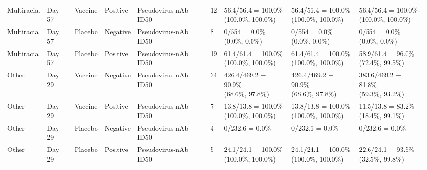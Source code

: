 \documentclass[]{book}
\theoremstyle{definition}
\theoremstyle{definition}
\theoremstyle{definition}
\newcommand{\1}{\mathbbm{1}}
\begin{document}
\begin{landscape}
\begin{ThreePartTable}
\begin{longtable}[t]{>{\raggedright\arraybackslash}p{2.7cm}llllllll}
\hspace{1em}Multiracial & Day 57 & Vaccine & Positive & Pseudovirus-nAb ID50 & 12 & \makecell[l]{56.4/56.4 = 100.0\%\\(100.0\%, 100.0\%)} & \makecell[l]{56.4/56.4 = 100.0\%\\(100.0\%, 100.0\%)} & \makecell[l]{56.4/56.4 = 100.0\%\\(100.0\%, 100.0\%)}\\
\hspace{1em}Multiracial & Day 57 & Placebo & Negative & Pseudovirus-nAb ID50 & 8 & \makecell[l]{0/554 = 0.0\%\\(0.0\%, 0.0\%)} & \makecell[l]{0/554 = 0.0\%\\(0.0\%, 0.0\%)} & \makecell[l]{0/554 = 0.0\%\\(0.0\%, 0.0\%)}\\
\hspace{1em}Multiracial & Day 57 & Placebo & Positive & Pseudovirus-nAb ID50 & 19 & \makecell[l]{61.4/61.4 = 100.0\%\\(100.0\%, 100.0\%)} & \makecell[l]{61.4/61.4 = 100.0\%\\(100.0\%, 100.0\%)} & \makecell[l]{58.9/61.4 = 96.0\%\\(72.4\%, 99.5\%)}\\
\hspace{1em}Other & Day 29 & Vaccine & Negative & Pseudovirus-nAb ID50 & 34 & \makecell[l]{426.4/469.2 = 90.9\%\\(68.6\%, 97.8\%)} & \makecell[l]{426.4/469.2 = 90.9\%\\(68.6\%, 97.8\%)} & \makecell[l]{383.6/469.2 = 81.8\%\\(59.3\%, 93.2\%)}\\
\hspace{1em}Other & Day 29 & Vaccine & Positive & Pseudovirus-nAb ID50 & 7 & \makecell[l]{13.8/13.8 = 100.0\%\\(100.0\%, 100.0\%)} & \makecell[l]{13.8/13.8 = 100.0\%\\(100.0\%, 100.0\%)} & \makecell[l]{11.5/13.8 = 83.2\%\\(18.4\%, 99.1\%)}\\
\hspace{1em}Other & Day 29 & Placebo & Negative & Pseudovirus-nAb ID50 & 4 & 0/232.6 = 0.0\% & 0/232.6 = 0.0\% & 0/232.6 = 0.0\%\\
\hspace{1em}Other & Day 29 & Placebo & Positive & Pseudovirus-nAb ID50 & 5 & \makecell[l]{24.1/24.1 = 100.0\%\\(100.0\%, 100.0\%)} & \makecell[l]{24.1/24.1 = 100.0\%\\(100.0\%, 100.0\%)} & \makecell[l]{22.6/24.1 = 93.5\%\\(32.5\%, 99.8\%)}\\

\end{longtable}
\end{ThreePartTable}
\end{landscape}
\end{document}
